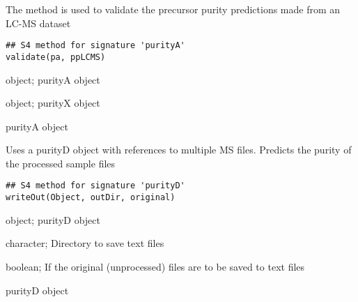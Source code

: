 \documentclass[letterpaper]{book}
\begin{document}
%
\begin{Description}\relax
The method is used to validate the precursor purity predictions made
from an LC-MS dataset
\end{Description}
%
\begin{Usage}
\begin{verbatim}
## S4 method for signature 'purityA'
validate(pa, ppLCMS)
\end{verbatim}
\end{Usage}
%
\begin{Arguments}
\begin{ldescription}
\item[\code{pa}] object; purityA object

\item[\code{ppLCMS}] object; purityX object
\end{ldescription}
\end{Arguments}
%
\begin{Value}
purityA object
\end{Value}
%
\begin{Description}\relax
Uses a purityD object with references to multiple MS files.
Predicts the purity of the processed sample files
\end{Description}
%
\begin{Usage}
\begin{verbatim}
## S4 method for signature 'purityD'
writeOut(Object, outDir, original)
\end{verbatim}
\end{Usage}
%
\begin{Arguments}
\begin{ldescription}
\item[\code{Object}] object; purityD object

\item[\code{outDir}] character; Directory to save text files

\item[\code{original}] boolean; If the original (unprocessed) files are to be saved to text files
\end{ldescription}
\end{Arguments}
%
\begin{Value}
purityD object
\end{Value}
\printindex{}
\end{document}
